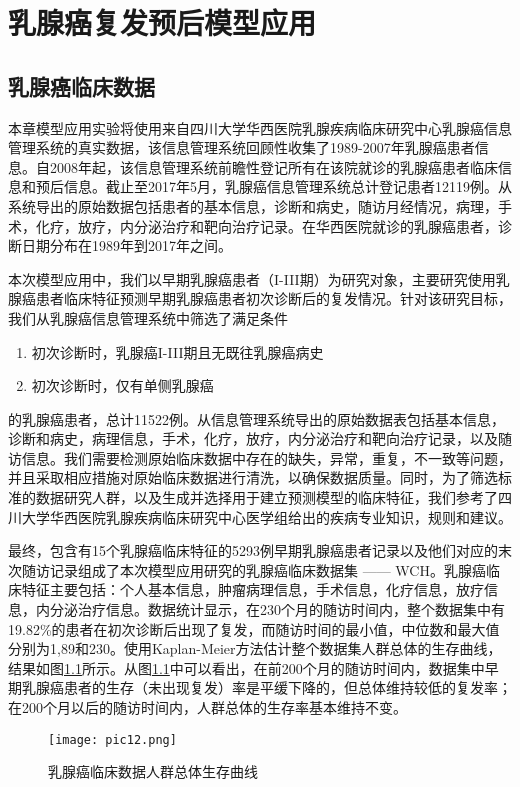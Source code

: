 \chapter{乳腺癌复发预后模型应用}

\section{乳腺癌临床数据}
本章模型应用实验将使用来自四川大学华西医院乳腺疾病临床研究中心乳腺癌信息管理系统的真实数据，该信息管理系统回顾性收集了1989-2007年乳腺癌患者信息。自2008年起，该信息管理系统前瞻性登记所有在该院就诊的乳腺癌患者临床信息和预后信息。截止至2017年5月，乳腺癌信息管理系统总计登记患者12119例。从系统导出的原始数据包括患者的基本信息，诊断和病史，随访月经情况，病理，手术，化疗，放疗，内分泌治疗和靶向治疗记录。在华西医院就诊的乳腺癌患者，诊断日期分布在1989年到2017年之间。

本次模型应用中，我们以早期乳腺癌患者（I-III期）为研究对象，主要研究使用乳腺癌患者临床特征预测早期乳腺癌患者初次诊断后的复发情况。针对该研究目标，我们从乳腺癌信息管理系统中筛选了满足条件
\begin{enumerate}
	\item 初次诊断时，乳腺癌I-III期且无既往乳腺癌病史
	\item 初次诊断时，仅有单侧乳腺癌
\end{enumerate}
的乳腺癌患者，总计11522例。从信息管理系统导出的原始数据表包括基本信息，诊断和病史，病理信息，手术，化疗，放疗，内分泌治疗和靶向治疗记录，以及随访信息。我们需要检测原始临床数据中存在的缺失，异常，重复，不一致等问题，并且采取相应措施对原始临床数据进行清洗，以确保数据质量。同时，为了筛选标准的数据研究人群，以及生成并选择用于建立预测模型的临床特征，我们参考了四川大学华西医院乳腺疾病临床研究中心医学组给出的疾病专业知识，规则和建议。

最终，包含有15个乳腺癌临床特征的5293例早期乳腺癌患者记录以及他们对应的末次随访记录组成了本次模型应用研究的乳腺癌临床数据集 —— WCH。乳腺癌临床特征主要包括：个人基本信息，肿瘤病理信息，手术信息，化疗信息，放疗信息，内分泌治疗信息。数据统计显示，在230个月的随访时间内，整个数据集中有19.82\%的患者在初次诊断后出现了复发，而随访时间的最小值，中位数和最大值分别为1,89和230。使用Kaplan-Meier方法估计整个数据集人群总体的生存曲线，结果如图\ref{pic12}所示。从图\ref{pic12}中可以看出，在前200个月的随访时间内，数据集中早期乳腺癌患者的生存（未出现复发）率是平缓下降的，但总体维持较低的复发率；在200个月以后的随访时间内，人群总体的生存率基本维持不变。

\begin{figure}[H]
\texttt{[image: pic12.png]}
\caption{乳腺癌临床数据人群总体生存曲线}
\label{pic12}
\end{figure}

